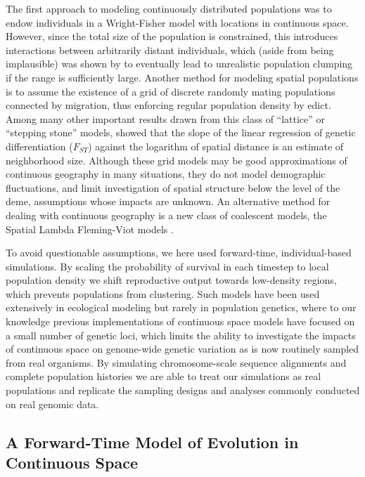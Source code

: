 \documentclass[10pt,twoside,lineno,hidelinks]{preprint}
\begin{document}
The first approach to modeling continuously distributed populations
was to endow individuals in a Wright-Fisher model with locations in continuous space.
However, since the total size of the population is constrained, this introduces interactions between arbitrarily distant individuals,
which (aside from being implausible) 
was shown by \citet{Felsenstein1975} to eventually lead to unrealistic population clumping
if the range is sufficiently large.
Another method for modeling spatial populations is to assume the existence of a grid of discrete randomly mating populations connected by migration, 
thus enforcing regular population density by edict.
Among many other important results drawn from this class of ``lattice'' or ``stepping stone'' models, 
\citet{Rousset1997} showed that the slope of the linear regression of genetic differentiation ($F_{ST}$) against the logarithm of spatial distance is an estimate of neighborhood size. 
Although these grid models may be good approximations of continuous geography in many situations,
they do not model demographic fluctuations, and limit investigation of spatial structure below the level of the deme,
assumptions whose impacts are unknown. 
An alternative method for dealing with continuous geography is a new class of coalescent models,
the Spatial Lambda Fleming-Viot models \citep{Barton2010,Kelleher2014}.

To avoid questionable assumptions, we here used forward-time, individual-based simulations. By scaling the probability of survival in each timestep to local population density we shift reproductive output towards low-density regions, which prevents populations from clustering. 
Such models have been used extensively in ecological modeling but rarely in population genetics, where to our knowledge previous implementations of continuous space models have focused on a small number of genetic loci, which limits the ability to investigate the impacts of continuous space on genome-wide genetic variation as is now routinely sampled from real organisms.  
By simulating chromosome-scale sequence alignments and complete population histories we are able to treat our simulations as real populations and replicate the sampling designs and analyses commonly conducted on real genomic data.

\subsection{A Forward-Time Model of Evolution in Continuous Space}
\end{document}
